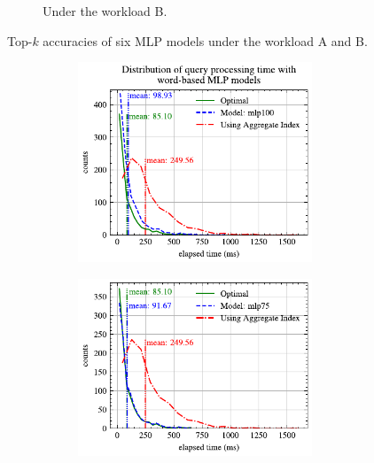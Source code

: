 \begin{figure}[!th]
\begin{subfigure}{0.45\textwidth}
		\caption{Under the workload B.}
		\label{fig:top_k_mlp_B}
	\end{subfigure}
	\caption{Top-$k$ accuracies of six MLP models under the workload A and B.}
	\label{fig:top_k_mlp_all}
\end{figure}
\begin{figure}[!th]
	\centering
	\begin{subfigure}{0.45\textwidth}
		\begin{subfigure}{\textwidth}
			\centering
%			
			\includegraphics[]{my/graphics/perf_dist_mlp100_A.pdf}
		\end{subfigure}
		\vfill
		\begin{subfigure}{\textwidth}
			\centering
%			
			\includegraphics[]{my/graphics/perf_dist_mlp75_A.pdf}

\end{subfigure}
\end{subfigure}
\end{figure}
